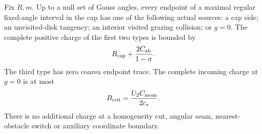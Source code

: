 \begin{lemma}
\label{lem:rbv-endpoints}
Fix $R,m$.  Up to a null set of Gauss angles, every endpoint of
a maximal regular fixed-angle interval in the cap has one of the
following actual sources: a cap side; an unvisited-disk tangency;
an interior visited grazing collision; or $g=0$.  The complete
positive charge of the first two types is bounded by
\begin{equation}\label{eq:rbv-boundary-total}
                   B_{\rm cap}+\frac{2C_{\rm ab}}{1-\sigma}.
\end{equation}
The third type has zero coarea endpoint trace.  The complete
incoming charge at $g=0$ is at most
\begin{equation}\label{eq:rbv-critical-total}
                         B_{\rm crit}
                             =\frac{U_2C_{\rm mom}}{2c_*}.
\end{equation}
There is no additional charge at a homogeneity cut, angular seam,
nearest-obstacle switch or auxiliary coordinate boundary.
\end{lemma}
